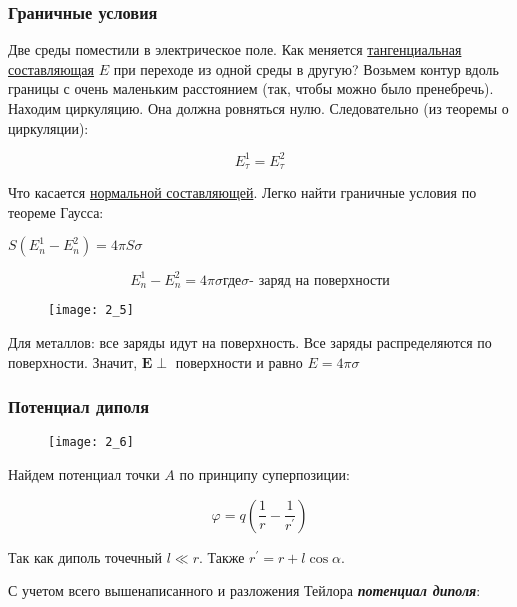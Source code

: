 \subsubsection{Граничные условия}

Две среды поместили в электрическое поле. Как меняется \underline{тангенциальная составляющая} $E$ при переходе из одной среды в другую? Возьмем контур вдоль границы с очень маленьким расстоянием (так, чтобы можно было пренебречь). Находим циркуляцию. Она должна ровняться нулю. Следовательно (из теоремы о циркуляции):

\begin{equation}
E_{\tau}^{1} = E_{\tau}^{2}
\end{equation}

Что касается \underline{нормальной составляющей}. Легко найти граничные условия по теореме Гаусса:

$S(E_{n}^{1} - E_{n}^{2}) = 4 \pi S \sigma$

\begin{equation}
E_{n}^{1} - E_{n}^{2} = 4 \pi \sigma \text{где} \sigma \text{- заряд на поверхности}
\end{equation}

\begin{figure}[!ht]
\centering
 \texttt{[image: 2\_5]}     
 \label{fig:my_label}
 \caption{}
\end{figure}

Для металлов: все заряды идут на поверхность. Все заряды распределяются по поверхности. Значит, $\mathbf{E} \perp$ поверхности и равно $E = 4 \pi \sigma$

\subsubsection{Потенциал диполя}

\begin{figure}[!ht]
\centering
 \texttt{[image: 2\_6]}     
 \label{fig:my_label}
 \caption{}
\end{figure}

Найдем потенциал точки $A$ по принципу суперпозиции:

$$\varphi = q \left( \frac{1}{r} - \frac{1}{r^{'}} \right)$$

Так как диполь точечный $l \ll r$. Также  $r^{'} = r +l \cos \alpha$.

С учетом всего вышенаписанного и разложения Тейлора \textit{\textbf{потенциал диполя}}:

